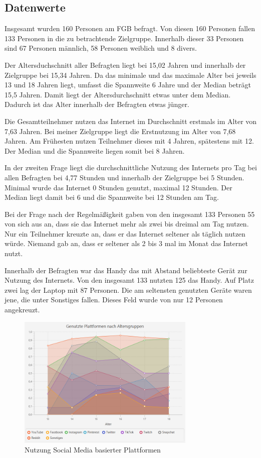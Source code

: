 \subsection{Datenwerte}

Insgesamt wurden 160 Personen am FGB befragt. Von diesen 160 Personen fallen 133 Personen in die zu betrachtende Zielgruppe. Innerhalb dieser 33 Personen sind 67 Personen männlich, 58 Personen weiblich und 8 divers.

Der Altersduchschnitt aller Befragten liegt bei 15,02 Jahren und innerhalb der Zielgruppe bei 15,34 Jahren. Da das minimale und das maximale Alter bei jeweils 13 und 18 Jahren liegt, umfasst die Spannweite 6 Jahre und der Median beträgt 15,5 Jahren. Damit liegt der Altersdurchschnitt etwas unter dem Median. Dadurch ist das Alter innerhalb der Befragten etwas jünger. 

Die Gesamtteilnehmer nutzen das Internet im Durchschnitt erstmals im Alter von 7,63 Jahren. Bei meiner Zielgruppe liegt die Erstnutzung im Alter von 7,68 Jahren. Am Frühesten nutzen Teilnehmer dieses mit 4 Jahren, spätestens mit 12. Der Median und die Spannweite liegen somit bei 8 Jahren.

In der zweiten Frage liegt die durchschnittliche Nutzung des Internets pro Tag bei allen Befragten bei 4,77 Stunden und innerhalb der Zielgruppe bei 5 Stunden. Minimal wurde das Internet 0 Stunden genutzt, maximal 12 Stunden. Der Median liegt damit bei 6 und die Spannweite bei 12 Stunden am Tag.

Bei der Frage nach der Regelmäßigkeit gaben von den insgesamt 133 Personen 55 von sich aus an, dass sie das Internet mehr als zwei bis dreimal am Tag nutzen. Nur ein Teilnehmer kreuzte an, dass er das Internet seltener als täglich nutzen würde. Niemand gab an, dass er seltener als 2 bis 3 mal im Monat das Internet nutzt.

Innerhalb der Befragten war das Handy das mit Abstand beliebteste Gerät zur Nutzung des Internets. Von den insgesamt 133 nutzten 125 das Handy. Auf Platz zwei lag der Laptop mit 87 Personen. Die am seltensten genutzten Geräte waren jene, die unter Sonstiges fallen. Dieses Feld wurde von nur 12 Personen angekreuzt.

\begin{figure}[ht]
    \centering
    \includegraphics[width=8.5cm]{image/Diagramm Genutzte Plattformen.png}
    \caption{\label{imgs:diagramm_plattformen_datenwerte}Nutzung Social Media basierter Plattformen}
\end{figure}

